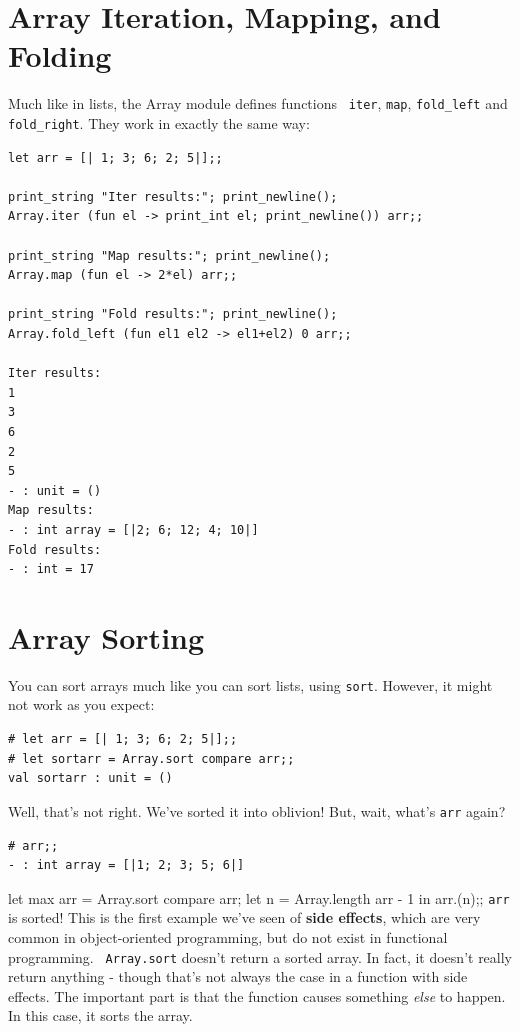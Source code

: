 \documentclass[10pt]{book}
\begin{document}
\section{Array Iteration, Mapping, and Folding}

Much like in lists, the Array module defines functions {\tt 
iter}, {\tt map}, {\tt \verb"fold_left"} and {\tt \verb"fold_right"}. 
They work in exactly the same way:

\beforeverb
\begin{verbatim}
let arr = [| 1; 3; 6; 2; 5|];;

print_string "Iter results:"; print_newline();
Array.iter (fun el -> print_int el; print_newline()) arr;;

print_string "Map results:"; print_newline();
Array.map (fun el -> 2*el) arr;;

print_string "Fold results:"; print_newline();
Array.fold_left (fun el1 el2 -> el1+el2) 0 arr;;

Iter results:
1
3
6
2
5
- : unit = ()
Map results:
- : int array = [|2; 6; 12; 4; 10|]
Fold results:
- : int = 17
\end{verbatim}
\afterverb

\section{Array Sorting}

You can sort arrays much like you can sort lists, using
{\tt sort}. However, it might not work as you expect:

\beforeverb
\begin{verbatim}
# let arr = [| 1; 3; 6; 2; 5|];;
# let sortarr = Array.sort compare arr;;
val sortarr : unit = ()
\end{verbatim}
\afterverb
Well, that's not right. We've sorted it into oblivion! 
But, wait, what's {\tt arr} again?

\beforeverb
\begin{verbatim}
# arr;;
- : int array = [|1; 2; 3; 5; 6|]
\end{verbatim}
\afterverb
let max arr = 
	Array.sort compare arr;
	let n = Array.length arr - 1 in 	
	arr.(n);;
{\tt arr} is sorted! This is the first example we've seen of 
{\bf side effects}, which are very common in object-oriented 
programming, but do not exist in functional programming. {\tt 
Array.sort} doesn't return a sorted array. In fact, it doesn't
really return anything - though that's not always the case in 
a function with side effects. The important part is that the 
function causes something {\it else} to happen. In this case, 
it sorts the array.
\end{document}
